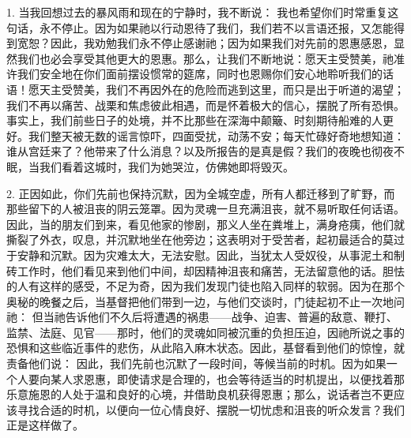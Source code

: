 1. 当我回想过去的暴风雨和现在的宁静时，我不断说： 我也希望你们时常重复这句话，永不停止。因为如果祂以行动恩待了我们，我们若不以言语还报，又怎能得到宽恕？因此，我劝勉我们永不停止感谢祂；因为如果我们对先前的恩惠感恩，显然我们也必会享受其他更大的恩惠。那么，让我们不断地说：愿天主受赞美，祂准许我们安全地在你们面前摆设惯常的筵席，同时也恩赐你们安心地聆听我们的话语！愿天主受赞美，我们不再因外在的危险而逃到这里，而只是出于听道的渴望；我们不再以痛苦、战栗和焦虑彼此相遇，而是怀着极大的信心，摆脱了所有恐惧。事实上，我们前些日子的处境，并不比那些在深海中颠簸、时刻期待船难的人更好。我们整天被无数的谣言惊吓，四面受扰，动荡不安；每天忙碌好奇地想知道：谁从宫廷来了？他带来了什么消息？以及所报告的是真是假？我们的夜晚也彻夜不眠，当我们看着这城时，我们为她哭泣，仿佛她即将毁灭。\par

2. 正因如此，你们先前也保持沉默，因为全城空虚，所有人都迁移到了旷野，而那些留下的人被沮丧的阴云笼罩。因为灵魂一旦充满沮丧，就不易听取任何话语。因此，当的朋友们到来，看见他家的惨剧，那义人坐在粪堆上，满身疮痍，他们就撕裂了外衣，叹息，并沉默地坐在他旁边；这表明对于受苦者，起初最适合的莫过于安静和沉默。因为灾难太大，无法安慰。因此，当犹太人受奴役，从事泥土和制砖工作时，他们看见来到他们中间，却因精神沮丧和痛苦，无法留意他的话。胆怯的人有这样的感受，不足为奇，因为我们发现门徒也陷入同样的软弱。因为在那个奥秘的晚餐之后，当基督把他们带到一边，与他们交谈时，门徒起初不止一次地问祂： 但当祂告诉他们不久后将遭遇的祸患——战争、迫害、普遍的敌意、鞭打、监禁、法庭、见官——那时，他们的灵魂如同被沉重的负担压迫，因祂所说之事的恐惧和这些临近事件的悲伤，从此陷入麻木状态。因此，基督看到他们的惊惶，就责备他们说： 因此，我们先前也沉默了一段时间，等候当前的时机。因为如果一个人要向某人求恩惠，即使请求是合理的，也会等待适当的时机提出，以便找着那乐意施恩的人处于温和良好的心境，并借助良机获得恩惠；那么，说话者岂不更应该寻找合适的时机，以便向一位心情良好、摆脱一切忧虑和沮丧的听众发言？我们正是这样做了。\par


